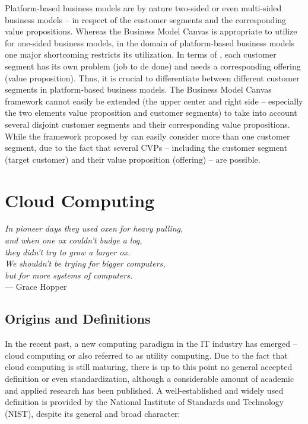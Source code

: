 Platform-based business models are by nature two-sided or even multi-sided business models -- in respect of the customer segments and the corresponding value propositions. Whereas the Business Model Canvas is appropriate to utilize for one-sided business models, in the domain of platform-based business models one major shortcoming restricts its utilization. In terms of \citet{Johnson2008}, each customer segment has its own problem (job to de done) and needs a corresponding offering (value proposition). Thus, it is crucial to differentiate between different customer segments in platform-based business models. The Business Model Canvas framework cannot easily be extended (the upper center and right side -- especially the two elements value proposition and customer segments) to take into account several disjoint customer segments and their corresponding value propositions. While the framework proposed by \citet{Johnson2008} can easily consider more than one customer segment, due to the fact that several \acp{CVP} -- including the customer segment (target customer) and their value proposition (offering) -- are possible.

\section{Cloud Computing}\label{ch:tf:paas}
\begin{flushright}{\slshape 
	In pioneer days they used oxen for heavy pulling,\\
	and when one ox couldn't budge a log,\\
	they didn't try to grow a larger ox.\\
	We shouldn't be trying for bigger computers,\\
	but for more systems of computers.} \\ \medskip
	--- Grace Hopper
\end{flushright}

\subsection{Origins and Definitions}

In the recent past, a new computing paradigm in the IT industry has emerged -- cloud computing or also referred to as utility computing. Due to the fact that cloud computing is still maturing, there is up to this point no general accepted definition or even standardization, although a considerable amount of academic and applied research has been published. A well-established and widely used definition is provided by the National Institute of Standards and Technology (NIST), despite its general and broad character:


